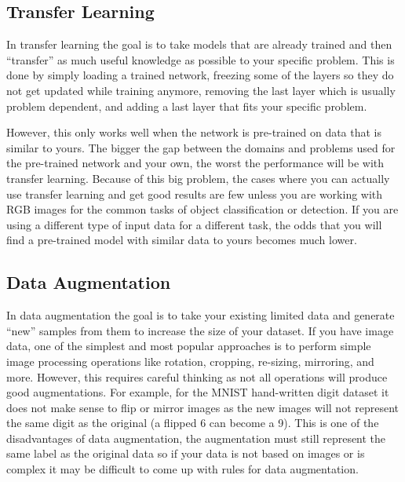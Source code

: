 \subsection{Transfer Learning}
In transfer learning the goal is to take models that are already trained and then ``transfer'' as much useful knowledge as possible to your specific problem. This is done by simply loading a trained network, freezing some of the layers so they do not get updated while training anymore, removing the last layer which is usually problem dependent, and adding a last layer that fits your specific problem. 

However, this only works well when the network is pre-trained on data that is similar to yours. The bigger the gap between the domains and problems used for the pre-trained network and your own, the worst the performance will be with transfer learning. Because of this big problem, the cases where you can actually use transfer learning and get good results are few unless you are working with RGB images for the common tasks of object classification or detection. If you are using a different type of input data for a different task, the odds that you will find a pre-trained model with similar data to yours becomes much lower.

\subsection{Data Augmentation}
In data augmentation the goal is to take your existing limited data and generate ``new'' samples from them to increase the size of your dataset. If you have image data, one of the simplest and most popular approaches is to perform simple image processing operations like rotation, cropping, re-sizing, mirroring, and more. However, this requires careful thinking as not all operations will produce good augmentations. For example, for the MNIST \cite{MNIST} hand-written digit dataset it does not make sense to flip or mirror images as the new images will not represent the same digit as the original (a flipped 6 can become a 9). This is one of the disadvantages of data augmentation, the augmentation must still represent the same label as the original data so if your data is not based on images or is complex it may be difficult to come up with rules for data augmentation.

